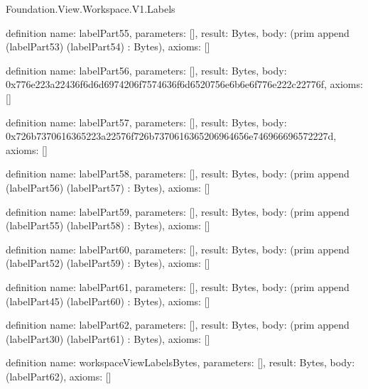 \begin{lexlean}{Foundation.View.Workspace.V1.Labels}
\begin{semanticmodule}
definition{
  name: labelPart55,
  parameters: [],
  result: Bytes,
  body: (prim append (labelPart53) (labelPart54) : Bytes),
  axioms: []
}

definition{
  name: labelPart56,
  parameters: [],
  result: Bytes,
  body: 0x776e223a22436f6d6d6974206f7574636f6d6520756e6b6e6f776e222c22776f,
  axioms: []
}

definition{
  name: labelPart57,
  parameters: [],
  result: Bytes,
  body: 0x726b7370616365223a22576f726b7370616365206964656e746966696572227d,
  axioms: []
}

definition{
  name: labelPart58,
  parameters: [],
  result: Bytes,
  body: (prim append (labelPart56) (labelPart57) : Bytes),
  axioms: []
}

definition{
  name: labelPart59,
  parameters: [],
  result: Bytes,
  body: (prim append (labelPart55) (labelPart58) : Bytes),
  axioms: []
}

definition{
  name: labelPart60,
  parameters: [],
  result: Bytes,
  body: (prim append (labelPart52) (labelPart59) : Bytes),
  axioms: []
}

definition{
  name: labelPart61,
  parameters: [],
  result: Bytes,
  body: (prim append (labelPart45) (labelPart60) : Bytes),
  axioms: []
}

definition{
  name: labelPart62,
  parameters: [],
  result: Bytes,
  body: (prim append (labelPart30) (labelPart61) : Bytes),
  axioms: []
}

definition{
  name: workspaceViewLabelsBytes,
  parameters: [],
  result: Bytes,
  body: (labelPart62),
  axioms: []
}
\end{semanticmodule}
\end{lexlean}
